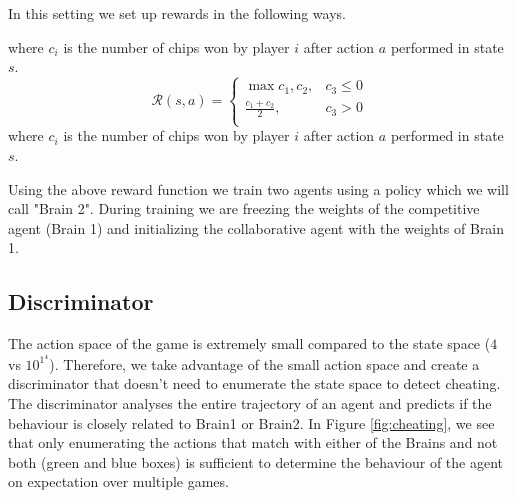 \documentclass{article}
\begin{document}
In this setting we set up rewards in the following ways.

where $c_{i}$ is the number of chips won by player $i$ after action $a$ performed in state $s$.
$$
\mathcal{R}(s, a)=\begin{cases}
			\max{c_1, c_2}, & c_3 \leq 0\\
			\displaystyle \frac{c_1 + c_2}{2}, & c_3 > 0\\
		 \end{cases}
$$
where $c_{i}$ is the number of chips won by player $i$ after action $a$ performed in state $s$.

Using the above reward function we train two agents using a policy which we will call "Brain 2". During training we are freezing the weights of the competitive agent (Brain 1) and initializing the collaborative agent with the weights of Brain 1.

\subsection{Discriminator} \label{Discriminator}%

The action space of the game is extremely small compared to the state space ($4$ vs $10^1^4$). Therefore, we take advantage of the small action space and create a discriminator that doesn't need to enumerate the state space to detect cheating. The discriminator analyses the entire trajectory of an agent and predicts if the behaviour is closely related to Brain1 or Brain2. In Figure \ref{fig:cheating}, we see that only enumerating the actions that match with either of the Brains and not both (green and blue boxes) is sufficient to determine the behaviour of the agent on expectation over multiple games. 
\end{document}
